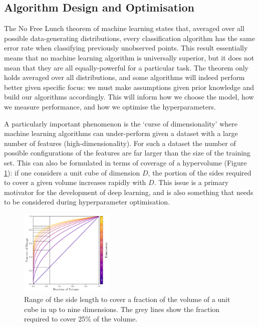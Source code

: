 \subsection{Algorithm Design and Optimisation}

The No Free Lunch theorem of machine learning \cite{NoFreeLunch} states that, averaged over all possible data-generating distributions, every classification algorithm has the same error rate when classifying previously unobserved points.
This result essentially means that no machine learning algorithm is universally superior, but it does not mean that they are all equally-powerful for a particular task. 
The theorem only holds averaged over all distributions, and some algorithms will indeed perform better given specific focus: we must make assumptions given prior knowledge and build our algorithms accordingly.
This will inform how we choose the model, how we measure performance, and how we optimise the hyperparameters. 


A particularly important phenomenon is the `curse of dimensionality' \cite{elementsOfStatsLearning} where machine learning algorithms can under-perform given a dataset with a large number of features (high-dimensionality).
For such a dataset the number of possible configurations of the features are far larger than the size of the training set. 
This can also be formulated in terms of coverage of a hypervolume (Figure \ref{fig:machine_learning:curse_of_dimensionality}): if one considers a unit cube of dimension $D$, the portion of the sides required to cover a given volume increases rapidly with $D$.
This issue is a primary motivator for the development of deep learning, and is also something that needs to be considered during hyperparameter optimisation. 
\begin{figure}[h!]
    \begin{center}
        \includegraphics[width=0.4\textwidth]{figures/machine_learning/curse_of_dimensionality.pdf}
    \end{center}
    \caption{Range of the side length to cover a fraction of the volume of a unit cube in up to nine dimensions. The grey lines show the fraction required to cover 25\% of the volume.}
        \label{fig:machine_learning:curse_of_dimensionality}
\end{figure}


